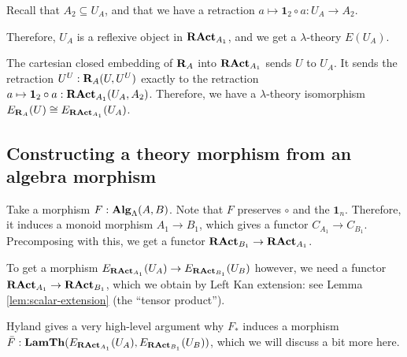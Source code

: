 \begin{definition}
  Recall that $ A_2 \subseteq U_A $, and that we have a retraction $ a \mapsto \mathbf 1_2 \circ a : U_A \to A_2 $.

  Therefore, $ U_A $ is a reflexive object in $ \mathbf{RAct}_{A_1} $, and we get a $ \lambda $-theory $ E(U_A) $.
\end{definition}

\begin{remark}
  The cartesian closed embedding of $ \mathbf{R}_A $ into $ \mathbf{RAct}_{A_1} $ sends $ U $ to $ U_A $. It sends the retraction $ U^U: \mathbf{R}_A(U, U^U) $ exactly to the retraction $ a \mapsto \mathbf 1_2 \circ a: \mathbf{RAct}_{A_1}(U_A, A_2) $. Therefore, we have a $ \lambda $-theory isomorphism $ E_{\mathbf{R}_A}(U) \cong E_{\mathbf{RAct}_{A_1}}(U_A) $.
\end{remark}

\subsection{Constructing a theory morphism from an algebra morphism}

Take a morphism $ F: \mathbf{Alg}_{\Lambda}(A, B) $. Note that $ F $ preserves $ \circ $ and the $ \mathbf 1_n $. Therefore, it induces a monoid morphism $ A_1 \to B_1 $, which gives a functor $ C_{A_1} \to C_{B_1} $. Precomposing with this, we get a functor $ \mathbf{RAct}_{B_1} \to \mathbf{RAct}_{A_1} $.

To get a morphism $ E_{\mathbf{RAct}_{A_1}}(U_A) \to E_{\mathbf{RAct}_{B_1}}(U_B) $ however, we need a functor $ \mathbf{RAct}_{A_1} \to \mathbf{RAct}_{B_1} $, which we obtain by Left Kan extension: see Lemma \ref{lem:scalar-extension} (the ``tensor product'').

Hyland gives a very high-level argument why $ F_* $ induces a morphism $ \bar F : \mathbf{LamTh}(E_{\mathbf{RAct}_{A_1}}(U_A), E_{\mathbf{RAct}_{B_1}}(U_B)) $, which we will discuss a bit more here.

